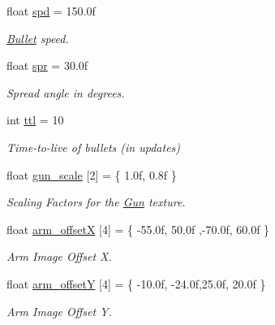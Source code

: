 \begin{DoxyCompactItemize}
float \mbox{\hyperlink{class_gun_a26f76c6539061bfbf4a517a35f289d10}{spd}} = 150.\+0f
\begin{DoxyCompactList}\small\item\em \mbox{\hyperlink{class_bullet}{Bullet}} speed. \end{DoxyCompactList}\item 
\mbox{\label{class_gun_a9fbd40fb2385b83f7fb00620c4762623}} 
float \mbox{\hyperlink{class_gun_a9fbd40fb2385b83f7fb00620c4762623}{spr}} = 30.\+0f
\begin{DoxyCompactList}\small\item\em Spread angle in degrees. \end{DoxyCompactList}\item 
\mbox{\label{class_gun_ad73acfc1ba6d1359a3bab0dae9c15d5a}} 
int \mbox{\hyperlink{class_gun_ad73acfc1ba6d1359a3bab0dae9c15d5a}{ttl}} = 10
\begin{DoxyCompactList}\small\item\em Time-\/to-\/live of bullets (in updates) \end{DoxyCompactList}\item 
\mbox{\label{class_gun_a262446cbbdcb7102b9f0f8abb2f5da3a}} 
float \mbox{\hyperlink{class_gun_a262446cbbdcb7102b9f0f8abb2f5da3a}{gun\+\_\+scale}} \mbox{[}2\mbox{]} = \{ 1.\+0f, 0.\+8f \}
\begin{DoxyCompactList}\small\item\em Scaling Factors for the \mbox{\hyperlink{class_gun}{Gun}} texture. \end{DoxyCompactList}\item 
\mbox{\label{class_gun_a8d80bac2e795dbfef6e9227d35d1f77e}} 
float \mbox{\hyperlink{class_gun_a8d80bac2e795dbfef6e9227d35d1f77e}{arm\+\_\+offsetX}} \mbox{[}4\mbox{]} = \{ -\/55.\+0f, 50.\+0f ,-\/70.\+0f, 60.\+0f \}
\begin{DoxyCompactList}\small\item\em Arm Image Offset X. \end{DoxyCompactList}\item 
\mbox{\label{class_gun_ada56112d63f1afae0726a78554dbd4c0}} 
float \mbox{\hyperlink{class_gun_ada56112d63f1afae0726a78554dbd4c0}{arm\+\_\+offsetY}} \mbox{[}4\mbox{]} = \{ -\/10.\+0f, -\/24.\+0f,25.\+0f, 20.\+0f \}
\begin{DoxyCompactList}\small\item\em Arm Image Offset Y. \end{DoxyCompactList}\item 

\end{DoxyCompactItemize}
